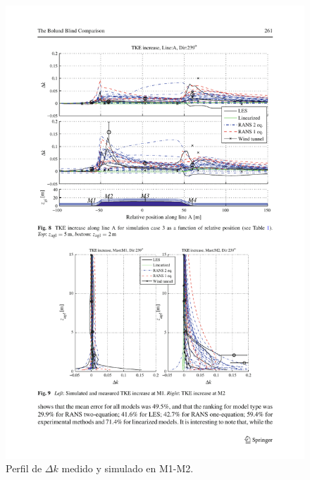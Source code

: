 \documentclass[mathserif,10pt]{beamer}
\begin{document}
\begin{frame}{}
	\begin{figure}[H]
		\centering
		\includegraphics[width=1\linewidth,trim={2.7cm 3.8cm 1.9cm 12.5cm},clip]{fig/an1/bolund4.pdf}%
		\caption{Perfil de $\Delta k$ medido y simulado en M1-M2.}
		\label{fig:an1_delta_tke_mast}
	\end{figure}
\end{frame}
\end{document}
